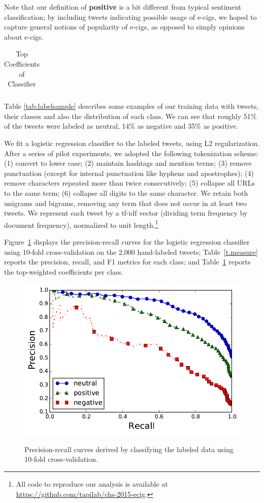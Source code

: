 \documentclass{sig-alternate}
\begin{document}
Note that our definition of {\bf positive} is a bit different from typical sentiment classification; by including tweets indicating possible usage of e-cigs, we hoped to capture general notions of popularity of e-cigs, as opposed to simply opinions about e-cigs.

\begin{table}[t]
\centering
\caption{Top Coefficients of Classifier\label{t.coef}}
\begin{tabular}{|r|p{14cm}| }
\hline

\end{tabular}
\end{table}


Table \ref{tab:labelsample} describes some examples of our training data with tweets, their classes and also the distribution of each class. We can see that roughly 51\% of the tweets were labeled as neutral, 14\% as negative and 35\% as positive. 

We fit a logistic regression classifier to the labeled tweets, using L2 regularization. After a series of pilot experiments, we adopted the following tokenization scheme: (1) convert to lower case; (2) maintain hashtags and mention terms; (3) remove punctuation (except for internal punctuation like hyphens and apostrophes); (4) remove characters repeated more than twice consecutively; (5) collapse all URLs to the same term; (6) collapse all digits to the same character. We retain both unigrams and bigrams, removing any term that does not occur in at least two tweets. We represent each tweet by a tf-idf vector (dividing term frequency by document frequency), normalized to unit length.\footnote{All code to reproduce our analysis is available at \url{https://github.com/tapilab/chs-2015-ecig}.}

Figure~\ref{f.prec_rec} displays the precision-recall curves for the logistic regression classifier using 10-fold cross-validation on the 2,000 hand-labeled tweets; Table~\ref{t.measure} reports the precision, recall, and F1 metrics for each class; and Table~\ref{t.coef} reports the top-weighted coefficients per class.

\begin{figure}[t]
\caption{Precision-recall curves derived by classifying the labeled data using 10-fold cross-validation.}
\includegraphics[width=\columnwidth]{nb/prec_rec.pdf}  %
\centering
\label{f.prec_rec}
\end{figure}
\end{document}
